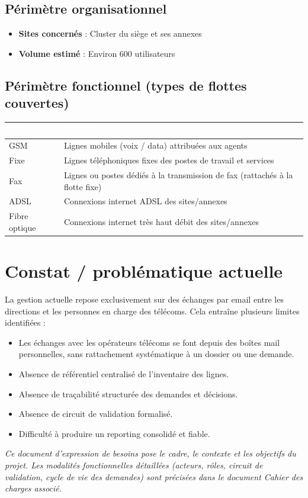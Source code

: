 \documentclass[11pt,a4paper]{article}
\begin{document}
\subsection{Périmètre organisationnel}

\begin{itemize}[leftmargin=*]
  \item \textbf{Sites concernés} : Cluster du siège et ses annexes
  \item \textbf{Volume estimé} : Environ 600 utilisateurs
\end{itemize}

\subsection{Périmètre fonctionnel (types de flottes couvertes)}

\begin{center}
\begin{tabular}{L{4cm} L{11cm}}
\toprule
{}\textcolor{white}{\textbf{Élément}} & \textcolor{white}{\textbf{Détail}} \\
\midrule
GSM & Lignes mobiles (voix / data) attribuées aux agents \\
Fixe & Lignes téléphoniques fixes des postes de travail et services \\
Fax & Lignes ou postes dédiés à la transmission de fax (rattachés à la flotte fixe) \\
ADSL & Connexions internet ADSL des sites/annexes \\
Fibre optique & Connexions internet très haut débit des sites/annexes \\
\bottomrule
\end{tabular}
\end{center}

\section{Constat / problématique actuelle}

La gestion actuelle repose exclusivement sur des échanges par email entre les directions et les personnes en charge des télécoms. Cela entraîne plusieurs limites identifiées :

\begin{itemize}[leftmargin=*]
  \item Les échanges avec les opérateurs télécoms se font depuis des boîtes mail personnelles, sans rattachement systématique à un dossier ou une demande.
  \item Absence de référentiel centralisé de l'inventaire des lignes.
  \item Absence de traçabilité structurée des demandes et décisions.
  \item Absence de circuit de validation formalisé.
  \item Difficulté à produire un reporting consolidé et fiable.
\end{itemize}

\bigskip
\noindent\textit{Ce document d'expression de besoins pose le cadre, le contexte et les objectifs du projet. Les modalités fonctionnelles détaillées (acteurs, rôles, circuit de validation, cycle de vie des demandes) sont précisées dans le document Cahier des charges associé.}
\end{document}
